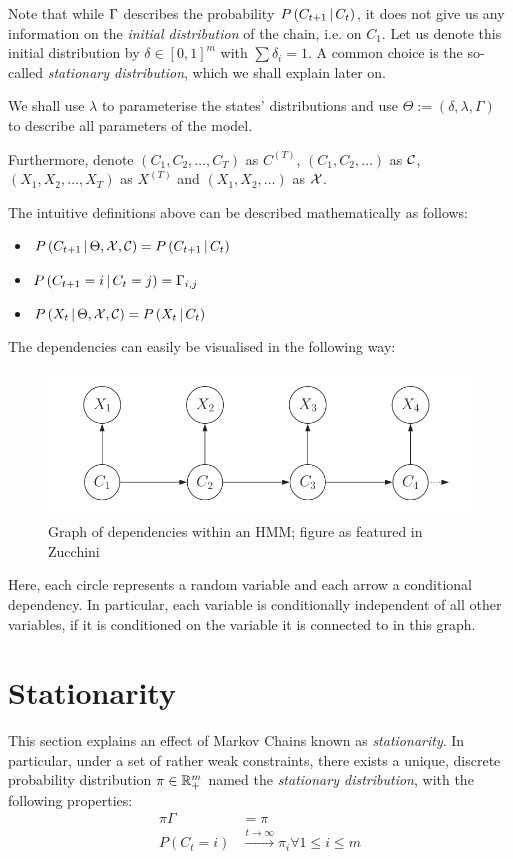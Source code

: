 Note that while $\Gamma$ describes the probability $P\left(C_{t+1} \, | \, C_t\right)$, it does not give us any information on the \textit{initial distribution} of the chain, i.e. on $C_1$. Let us denote this initial distribution by  $\delta \in [0,1]^m$ with $\sum \delta_i = 1$. A common choice is the so-called \textit{stationary distribution}, which we shall explain later on. 

We shall use $\lambda$ to parameterise the states' distributions and use $\Theta := \left(\delta, \lambda, \Gamma \right)$ to describe all parameters of the model.

Furthermore, denote $\left(C_1, C_2, \dots, C_T \right)$ as $C^{(T)}$, $\left(C_1, C_2, \dots \right)$ as $\mathcal{C}$, $\left(X_1, X_2, \dots, X_T \right)$ as $X^{(T)}$ and $\left(X_1, X_2, \dots \right)$ as $\mathcal{X}$. 

The intuitive definitions above can be described mathematically as follows:
\begin{itemize}	
	\item $P\left(C_{t+1} \, | \, \Theta, \mathcal{X}, \mathcal{C}\right) = P\left(C_{t+1} \, | \, C_t\right)$
	
	\item $P\left(C_{t+1} = i \, | \, C_t = j\right) = \Gamma_{i, j} $ 
	
	\item $P\left(X_t \, | \,  \Theta, \mathcal{X}, \mathcal{C}\right) = P\left(X_t \, | \, C_t\right)$
\end{itemize}


The dependencies can easily be visualised in the following way:
\begin{figure}[H]
\includegraphics[width=0.8\linewidth]{img/hmm_dependencies.png}
\caption{Graph of dependencies within an HMM; figure as featured in Zucchini}
\end{figure}
Here, each circle represents a random variable and each arrow a conditional dependency. In particular, each variable is conditionally independent of all other variables, if it is conditioned on the variable it is connected to in this graph. 


\section{Stationarity}
This section explains an effect of Markov Chains known as \textit{stationarity}. In particular, under a set of rather weak constraints, there exists a unique, discrete probability distribution $\pi \in \mathbb{R}_+^m$ named the \textit{stationary distribution}, with the following properties:
\begin{align*}
	\pi \Gamma &= \pi \\
	P(C_t = i) &\overset{t \rightarrow \infty}{\longrightarrow} \pi_i \forall 1 \leq i \leq m \\
\end{align*}

